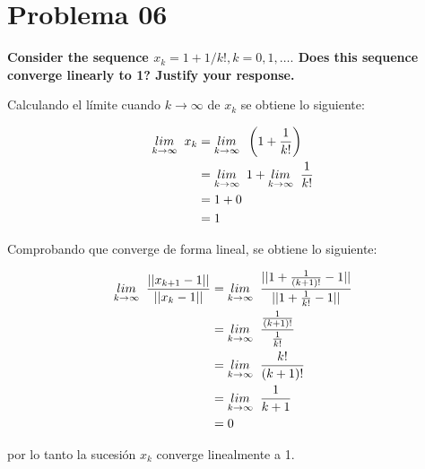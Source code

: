 \section*{Problema 06}

\textbf{Consider the sequence $x_k = 1 + 1/k!, k = 0, 1,\dots.$ Does this sequence converge linearly to 1? Justify your response.}

Calculando el límite cuando $k\rightarrow \infty$ de $x_k$ se obtiene lo siguiente:

\begin{align*}
    \underset{k \rightarrow \infty}{lim} \;\; x_k & = \underset{k \rightarrow \infty}{lim} \;\; \left (1+ \frac{1}{k!}\right )     \\
                          & = \underset{k \rightarrow \infty}{lim} \;\; 1 + \underset{k \rightarrow \infty}{lim} \;\; \frac{1}{k!} \\
                          & = 1 + 0                                                \\
                          & = 1
\end{align*}


Comprobando que converge de forma lineal, se obtiene lo siguiente:

\begin{align*}
    \underset{k \rightarrow \infty}{lim} \;\; \frac{||x_{k+1}-1||}{||x_k-1||} & = \underset{k \rightarrow \infty}{lim} \;\; \frac{||1+\frac{1}{(k+1)!}-1||}{||1+\frac{1}{k!}-1||} \\
                                                      & = \underset{k \rightarrow \infty}{lim} \;\; \frac{\frac{1}{(k+1)!}}{\frac{1}{k!}}                 \\
                                                      & = \underset{k \rightarrow \infty}{lim} \;\; \frac{k!}{(k+1)!}                                     \\
                                                      & = \underset{k \rightarrow \infty}{lim} \;\; \frac{1}{k+1}                                         \\
                                                      & = 0
\end{align*}

por lo tanto la sucesión $x_k$ converge linealmente a 1.